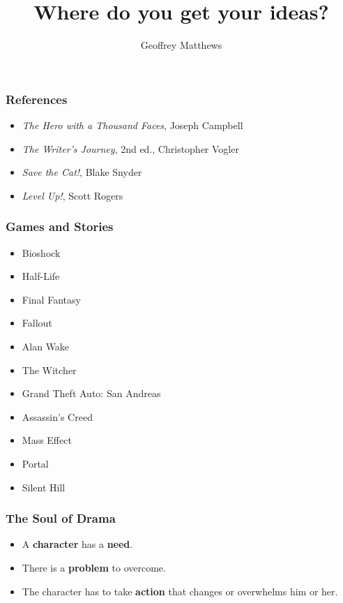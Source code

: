 \documentclass{beamer}
\title{Where do you get your ideas?}
\author{Geoffrey Matthews}
\institute{Western Washington University}
\newcommand{\bi}{\begin{itemize}}
\newcommand{\ei}{\end{itemize}}
\begin{document}
\begin{frame}[plain]
\titlepage
\end{frame}

\begin{frame}\frametitle{References}
\bi
\item {\em The Hero with a Thousand Faces}, Joseph Campbell
\item {\em The Writer's Journey}, 2nd ed., Christopher Vogler
\item {\em Save the Cat!}, Blake Snyder
\item {\em Level Up!}, Scott Rogers
\ei

\end{frame}

\begin{frame}\frametitle{Games and Stories}
  \bi
\item Bioshock
\item Half-Life
\item Final Fantasy
\item Fallout
\item Alan Wake
\item The Witcher
\item Grand Theft Auto: San Andreas
\item Assassin's Creed
\item Mass Effect
\item Portal
\item Silent Hill
  \ei
\end{frame}
\begin{frame}\frametitle{The Soul of Drama}
  {\Large
  \bi
\item A \textbf{character} has a \textbf{need}.
\item There is a \textbf{problem} to overcome.
\item The character has to take \textbf{action} that changes or
  overwhelms him or her.
  \ei}
\end{frame}
\end{document}
